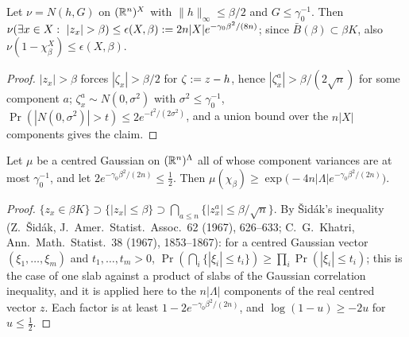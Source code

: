 
\begin{lemma}[tails]\label{rot:lem:R1tail}
Let $\nu=N(h,G)$ on $(\mathbb R^n)^X$ with $\|h\|_\infty\le\beta/2$ and $G\le\gamma_0^{-1}$. Then $\nu(\exists x\in X:\ |z_x|>\beta)\le\epsilon(X,\beta)\defeq2n|X|e^{-\gamma_0\beta^2/(8n)}$; since $\bar B(\beta)\subset\beta K$, also $\nu(1-\chi^X_\beta)\le\epsilon(X,\beta)$.
\end{lemma}
\begin{proof}
$|z_x|>\beta$ forces $|\zeta_x|>\beta/2$ for $\zeta:= z-h$, hence $|\zeta^a_x|>\beta/(2\sqrt n)$ for some component $a$; $\zeta^a_x\sim N(0,\sigma^2)$ with $\sigma^2\le\gamma_0^{-1}$, $\Pr(|N(0,\sigma^2)|>t)\le2e^{-t^2/(2\sigma^2)}$, and a union bound over the $n|X|$ components gives the claim.
\end{proof}

\begin{lemma}\label{rot:lem:R1gci}
Let $\mu$ be a centred Gaussian on $(\mathbb R^n)^\Lambda$ all of whose component variances are at most $\gamma_0^{-1}$, and let $2e^{-\gamma_0\beta^2/(2n)}\le\frac12$. Then $\mu(\chi_\beta)\ge\exp\big(-4n|\Lambda|e^{-\gamma_0\beta^2/(2n)}\big)$.
\end{lemma}
\begin{proof}
$\{z_x\in\beta K\}\supset\{|z_x|\le\beta\}\supset\bigcap_{a\le n}\{|z^a_x|\le\beta/\sqrt n\}$. By \v{S}id\'ak's inequality (Z.~\v{S}id\'ak, J.\ Amer.\ Statist.\ Assoc.\ 62 (1967), 626--633; C.~G.~Khatri, Ann.\ Math.\ Statist.\ 38 (1967), 1853--1867): for a centred Gaussian vector $(\xi_1,\dots,\xi_m)$ and $t_1,\dots,t_m>0$, $\Pr(\bigcap_i\{|\xi_i|\le t_i\})\ge\prod_i\Pr(|\xi_i|\le t_i)$; this is the case of one slab against a product of slabs of the Gaussian correlation inequality, and it is applied here to the $n|\Lambda|$ components of the real centred vector $z$. Each factor is at least $1-2e^{-\gamma_0\beta^2/(2n)}$, and $\log(1-u)\ge-2u$ for $u\le\frac12$.
\end{proof}

